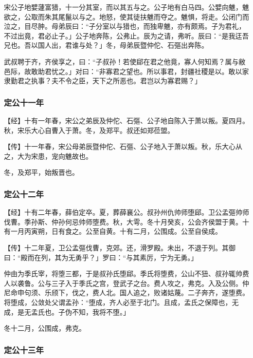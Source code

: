 \documentclass[]{article}
\begin{document}
宋公子地嬖蘧富猎，十一分其室，而以其五与之。公子地有白马四。公嬖向魋，魋欲之，公取而朱其尾鬣以与之。地怒，使其徒扶魋而夺之。魋惧，将走。公闭门而泣之，目尽肿。母弟辰曰：``子分室以与猎也，而独卑魋，亦有颇焉。子为君礼，不过出竟，君必止子。」公子地奔陈，公弗止。辰为之请，弗听。辰曰：``是我迋吾兄也。吾以国人出，君谁与处？」冬，母弟辰暨仲佗、石彄出奔陈。

武叔聘于齐，齐侯享之，曰：``子叔孙！若使郈在君之他竟，寡人何知焉？属与敝邑际，故敢助君忧之。」对曰：``非寡君之望也。所以事君，封疆社稷是以。敢以家隶勤君之执事？夫不令之臣，天下之所恶也。君岂以为寡君赐？」

\hypertarget{header-n2996}{%
\subsubsection{定公十一年}\label{header-n2996}}

【经】十有一年春，宋公之弟辰及仲佗、石彄、公子地自陈入于萧以叛。夏四月。秋，宋乐大心自曹入于萧。冬，及郑平。叔还如郑莅盟。

【传】十一年春，宋公母弟辰暨仲佗、石彄、公子地入于萧以叛。秋，乐大心从之，大为宋患，宠向魋故也。

冬，及郑平，始叛晋也。

\hypertarget{header-n3002}{%
\subsubsection{定公十二年}\label{header-n3002}}

【经】十有二年春，薛伯定卒。夏，葬薛襄公。叔孙州仇帅师堕郈。卫公孟彄帅师伐曹。季孙斯、仲孙何忌帅师堕费。秋，大雩。冬十月癸亥，公会齐侯盟于黄。十有一月丙寅朔，日有食之。公至自黄。十有二月，公围成。公至自侯成。

【传】十二年夏，卫公孟彄伐曹，克郊。还，滑罗殿。未出，不退于列。其御曰：``殿而在列，其为无勇乎？」罗曰：``与其素厉，宁为无勇。」

仲由为季氏宰，将堕三都，于是叔孙氏堕郈。季氏将堕费，公山不狃、叔孙辄帅费人以袭鲁。公与三子入于季氏之宫，登武子之台。费人攻之，弗克。入及公侧。仲尼命申句须、乐颀下，伐之，费人北。国人追之，败诸姑蔑。二子奔齐，遂堕费。将堕成，公敛处父谓孟孙：``堕成，齐人必至于北门。且成，孟氏之保障也，无成，是无孟氏也。子伪不知，我将不堕。」

冬十二月，公围成，弗克。

\hypertarget{header-n3009}{%
\subsubsection{定公十三年 }\label{header-n3009}}
\end{document}
